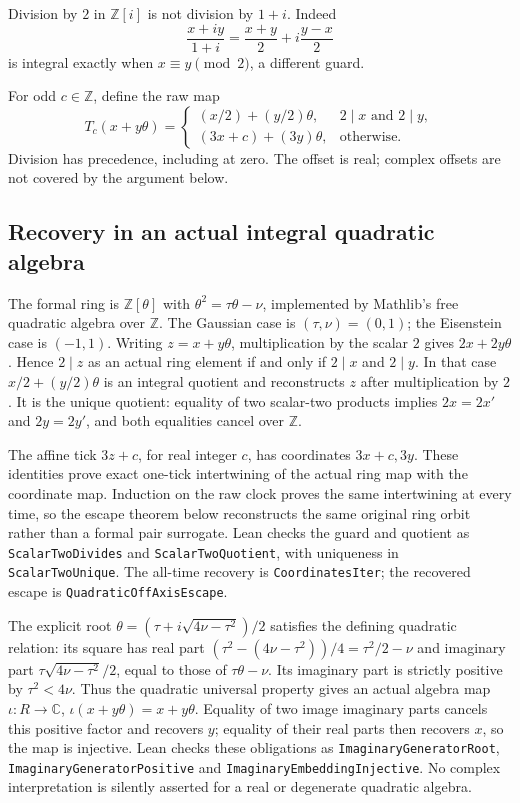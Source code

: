 \documentclass[11pt,letterpaper]{article}
\newcommand{\Z}{\mathbb{Z}}
\newcommand{\C}{\mathbb{C}}
\begin{document}
Division by \(2\) in \(\Z[i]\) is not division by \(1+i\). Indeed
\[
\frac{x+iy}{1+i}=\frac{x+y}{2}+i\frac{y-x}{2}
\]
is integral exactly when \(x\equiv y\pmod2\), a different guard.

For odd \(c\in\Z\), define the raw map
\[
T_c(x+y\theta)=\begin{cases}
(x/2)+(y/2)\theta,&2\mid x\text{ and }2\mid y,\\
(3x+c)+(3y)\theta,&\text{otherwise}.
\end{cases}
\]
Division has precedence, including at zero. The offset is real; complex offsets are not covered by the argument below.

\subsection{Recovery in an actual integral quadratic algebra}

The formal ring is \(\mathbb Z[\theta]\) with \(\theta^2=\tau\theta-\nu\), implemented by Mathlib's free quadratic algebra over \(\mathbb Z\). The Gaussian case is \((\tau,\nu)=(0,1)\); the Eisenstein case is \((-1,1)\). Writing \(z=x+y\theta\), multiplication by the scalar \(2\) gives \(2x+2y\theta\). Hence \(2\mid z\) as an actual ring element if and only if \(2\mid x\) and \(2\mid y\). In that case \(x/2+(y/2)\theta\) is an integral quotient and reconstructs \(z\) after multiplication by \(2\). It is the unique quotient: equality of two scalar-two products implies \(2x=2x'\) and \(2y=2y'\), and both equalities cancel over \(\mathbb Z\).

The affine tick \(3z+c\), for real integer \(c\), has coordinates \(3x+c,3y\). These identities prove exact one-tick intertwining of the actual ring map with the coordinate map. Induction on the raw clock proves the same intertwining at every time, so the escape theorem below reconstructs the same original ring orbit rather than a formal pair surrogate. Lean checks the guard and quotient as \texttt{ScalarTwoDivides} and \texttt{ScalarTwoQuotient}, with uniqueness in \texttt{ScalarTwoUnique}. The all-time recovery is \texttt{CoordinatesIter}; the recovered escape is \texttt{QuadraticOffAxisEscape}.

The explicit root \(\theta=(\tau+i\sqrt{4\nu-\tau^2})/2\) satisfies the defining quadratic relation: its square has real part \((\tau^2-(4\nu-\tau^2))/4=\tau^2/2-\nu\) and imaginary part \(\tau\sqrt{4\nu-\tau^2}/2\), equal to those of \(\tau\theta-\nu\). Its imaginary part is strictly positive by \(\tau^2<4\nu\). Thus the quadratic universal property gives an actual algebra map \(\iota:R\to\C\), \(\iota(x+y\theta)=x+y\theta\). Equality of two image imaginary parts cancels this positive factor and recovers \(y\); equality of their real parts then recovers \(x\), so the map is injective. Lean checks these obligations as \texttt{ImaginaryGeneratorRoot}, \texttt{ImaginaryGeneratorPositive} and \texttt{ImaginaryEmbeddingInjective}. No complex interpretation is silently asserted for a real or degenerate quadratic algebra.
\end{document}
